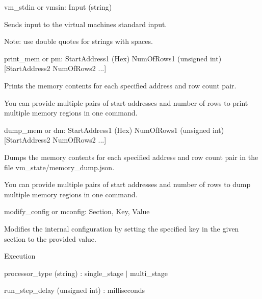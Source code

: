 \begin{DoxyItemize}
\item {\ttfamily vm\+\_\+stdin} or {\ttfamily vmsin}\+: {\ttfamily Input} (string)
\begin{DoxyItemize}
\item Sends input to the virtual machine\textquotesingle{}s standard input.
\item Note\+: use double quotes for strings with spaces.
\end{DoxyItemize}
\item {\ttfamily print\+\_\+mem} or {\ttfamily pm}\+: {\ttfamily Start\+Address1} (Hex) {\ttfamily Num\+Of\+Rows1} (unsigned int) \mbox{[}{\ttfamily Start\+Address2} {\ttfamily Num\+Of\+Rows2} ...\mbox{]}
\begin{DoxyItemize}
\item Prints the memory contents for each specified address and row count pair.
\item You can provide multiple pairs of start addresses and number of rows to print multiple memory regions in one command.
\end{DoxyItemize}
\item {\ttfamily dump\+\_\+mem} or {\ttfamily dm}\+: {\ttfamily Start\+Address1} (Hex) {\ttfamily Num\+Of\+Rows1} (unsigned int) \mbox{[}{\ttfamily Start\+Address2} {\ttfamily Num\+Of\+Rows2} ...\mbox{]}
\begin{DoxyItemize}
\item Dumps the memory contents for each specified address and row count pair in the file {\ttfamily vm\+\_\+state/memory\+\_\+dump.\+json}.
\item You can provide multiple pairs of start addresses and number of rows to dump multiple memory regions in one command.
\end{DoxyItemize}
\item {\ttfamily modify\+\_\+config} or {\ttfamily mconfig}\+: {\ttfamily Section}, {\ttfamily Key}, {\ttfamily Value}
\begin{DoxyItemize}
\item Modifies the internal configuration by setting the specified key in the given section to the provided value.
\item {\ttfamily Execution}
\begin{DoxyItemize}
\item {\ttfamily processor\+\_\+type} (string) \+: {\ttfamily single\+\_\+stage} $\vert$ {\ttfamily multi\+\_\+stage} ~\newline

\item {\ttfamily run\+\_\+step\+\_\+delay} (unsigned int) \+: milliseconds ~\newline


\end{DoxyItemize}
\end{DoxyItemize}
\end{DoxyItemize}
